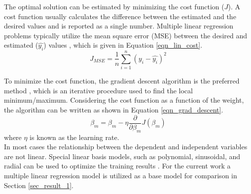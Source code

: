 \documentclass[a4paper,fleqn]{cas-dc}
\begin{document}
The optimal solution can be estimated by minimizing the cost function ($J$). A cost function usually calculates the difference between the estimated and the desired values and is reported as a single number. Multiple linear regression problems typically utilize the mean square error (MSE) between the desired and estimated ($\hat{y_i}$)  values \cite{Wheeler2019}, which is given in Equation \ref{eqn_lin_cost}.
\begin{equation}\label{eqn_lin_cost}
J_{MSE}=\frac{1}{n}\sum^n_{i=1}(y_i-\hat{y_i})^2
\end{equation} 

To minimize the cost function, the gradient descent algorithm is the preferred method \cite{Wen2022}, which is an iterative procedure used to find the local minimum/maximum. Considering the cost function as a function of the weight, the algorithm can be written as shown in Equation \ref{eqn_grad_descent}.  
\begin{equation}\label{eqn_grad_descent}
\beta_{m} = \beta_m-\eta\frac{\partial}{\partial\beta_m}J(\beta_m)
\end{equation}
where $\eta$ is known as the learning rate.\\

In most cases the relationship between the dependent and independent variables are not linear. Special linear basis models, such as polynomial, sinusoidal, and radial can be used to optimize the training results \cite{Rasmussen2006}. For the current work a multiple linear regression model is utilized as a base model for comparison in Section \ref{sec_result_1}. 
\end{document}
